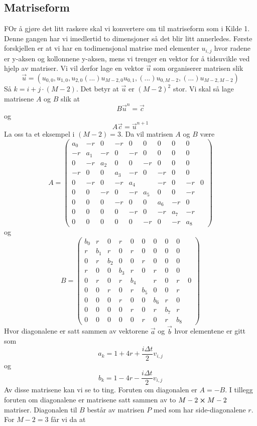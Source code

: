 \documentclass[reprint,english,notitlepage]{revtex4-2}  %
\begin{document}
\subsection{Matriseform}
FOr å gjøre det litt raskere skal vi konvertere om til matriseform som i Kilde 1. Denne gangen har vi imedlertid to dimensjoner så det blir litt annerledes. Første forskjellen er at vi har en todimensjonal matrise med elementer $u_{i,j}$ hvor radene er y-aksen og kollonnene y-aksen, mens vi trenger en vektor for å tidsuvikle ved hjelp av matriser. Vi vil derfor lage en vektor $\vec{u}$ som organiserer matrisen slik
$$
\vec{u}=(u_{0,0}, u_{1,0}, u_{2,0} (...) u_{M-2, 0} u_{0,1},(...) u_{0, M-2}, (...) u_{M-2, M-2})
$$
Så $k=i+j\cdot (M-2)$. Det betyr at $\vec{u}$ er $(M-2)^2$ stor.
\newline 
Vi skal så lage matrisene $A$ og $B$ slik at
$$
B\vec{u}^n=\vec{c}
$$
og
$$
A\vec{c}=\vec{u}^{n+1}
$$
La oss ta et eksempel i $(M-2)=3$. Da vil matrisen $A$ og $B$ være
$$
A=\begin{pmatrix}
	a_0 & -r & 0 & -r & 0 &0&0&0&0 \\
	-r & a_1 & -r & 0 & -r& 0&0&0&0 \\
	0 &-r &a_2&0&0&-r&0&0&0 \\
	-r &0&0&a_3&-r&0&-r&0&0 \\
	0&-r&0&-r&a_4&&-r&0&-r&0 \\
	0&0&-r&0&-r&a_5&0&0&-r \\
	0&0&0&-r&0&0&a_6&-r&0 \\
	0&0&0&0&-r&0&-r&a_7&-r \\
	0&0&0&0&0&-r&0&-r&a_8
\end{pmatrix}
$$
og
$$
B=\begin{pmatrix}
	b_0 & r & 0 & r & 0 &0&0&0&0 \\
	r & b_1 & r & 0 & r& 0&0&0&0 \\
	0 &r &b_2&0&0&r&0&0&0 \\
	r &0&0&b_3&r&0&r&0&0 \\
	0&r&0&r&b_4&&r&0&r&0 \\
	0&0&r&0&r&b_5&0&0&r \\
	0&0&0&r&0&0&b_6&r&0 \\
	0&0&0&0&r&0&r&b_7&r \\
	0&0&0&0&0&r&0&r&b_8
\end{pmatrix}
$$
Hvor diagonalene er satt sammen av vektorene $\vec{a}$ og $\vec{b}$ hvor elementene er gitt som
$$
a_k=1+4r+\frac{i\Delta t}{2}v_{i,j}
$$
og
$$
b_k=1-4r-\frac{i\Delta t}{2}v_{i,j}
$$
Av disse matrisene kan vi se to ting. Foruten om diagonalen er $A=-B$. I tillegg foruten om diagonalene er matrisene satt sammen av to $M-2 \cross M-2$ matriser. Diagonalen til $B$ består av matrisen $P$ med som har side-diagonalene $r$. For $M-2=3$ får vi da at
\end{document}
